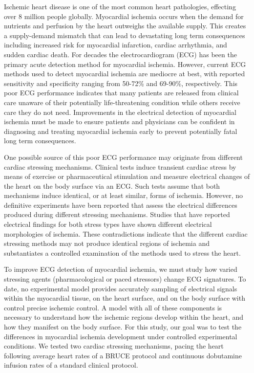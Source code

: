 \documentclass[twocolumn]{cinc}
\begin{document}
Ischemic heart disease is one of the most common heart pathologies, effecting over 8 million people globally. \cite{Roth2015} Myocardial ischemia occurs when the demand for nutrients and perfusion by the heart outweighs the available supply. This creates a supply-demand mismatch that can lead to devastating long term consequences including increased risk for myocardial infarction, cardiac arrhythmia, and sudden cardiac death.\cite{Roth2015} For decades the electrocardiogram (ECG) has been the primary acute detection method for myocardial ischemia. \cite{McCarthy1990} However, current ECG methods used to detect myocardial ischemia are mediocre at best, with reported sensitivity and specificity ranging from 50-72\% and 69-90\%, respectively. \cite{Akkerhuis2011} This poor ECG performance indicates that many patients are released from clinical care unaware of their potentially life-threatening condition while others receive care they do not need. Improvements in the electrical detection of myocardial ischemia must be made to ensure patients and physicians can be confident in diagnosing and treating myocardial ischemia early to prevent potentially fatal long term consequences. 

One possible source of this poor ECG performance may originate from different cardiac stressing mechanisms. Clinical tests  induce transient cardiac stress by means of exercise or pharmaceutical stimulation and measure electrical changes of the heart on the body surface via an  ECG. Such tests  assume that both mechanisms induce identical, or at least similar, forms of ischemia. However, no definitive experiments have been reported that assess the electrical differences produced during different stressing mechanisms. Studies that have reported electrical findings for both stress types have shown different electrical morphologies of ischemia. These contradictions indicate that the different cardiac stressing methods may not produce identical regions of ischemia and substantiates a controlled examination of the methods used to stress the heart. 

To improve ECG detection of myocardial ischemia, we must study how varied stressing agents (pharmacological or paced stressors) change ECG signatures. To date, no experimental model provides accurately sampling of electrical signals within the myocardial tissue, on the heart surface, and on the body surface with control precise ischemic control. A model with all of these components is necessary to understand how the ischemic regions develop within the heart, and how they manifest on the body surface. For this study, our goal was to test the differences in myocardial ischemia development under controlled experimental conditions. We tested two cardiac stressing mechanisms, pacing the heart following average heart rates of a BRUCE protocol and continuous dobutamine infusion rates of a standard clinical protocol. 
\end{document}
